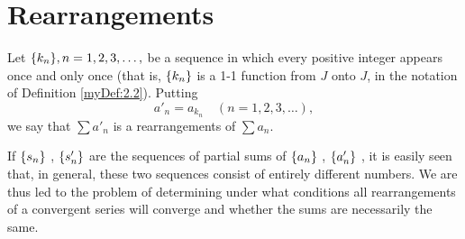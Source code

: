 \section{Rearrangements}
\begin{myDef}
    \label{myDef:3.52}
    Let $\protect\{k_n\}, n=1,2,3,\dots,$ be a sequence in which every positive integer appears once and only once 
    (that is, $\protect\{k_n\}$ is a 1-1 function from $J$ onto $J$, in the notation of Definition \ref{myDef:2.2}).
    Putting
    \begin{equation*}
        a'_n = a_{k_n} \quad (n = 1,2,3,\dots),
    \end{equation*}
    we say that $\sum a'_n$ is a rearrangements of $\sum a_n$.
\end{myDef}

If 
$\protect\{s_n\}$ ,
$\protect\{s'_n\}$ 
are the sequences of partial sums of 
$\protect\{a_n\}$ ,
$\protect\{a'_n\}$ ,
it is easily seen that, in general,
these two sequences consist of entirely different numbers.
We are thus led to the problem of determining under what conditions all rearrangements of a convergent series will converge and whether the sums are necessarily the same.


